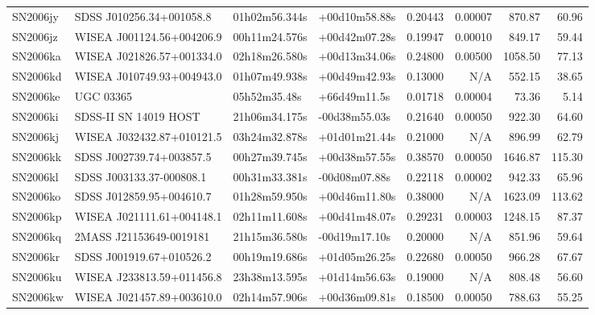 \begin{longtable}{llllrrrr}
SN2006jy         &        SDSS J010256.34+001058.8 &   01h02m56.344s &   +00d10m58.88s &  0.20443 &  0.00007 &   870.87 &       60.96 \\
SN2006jz         &       WISEA J001124.56+004206.9 &   00h11m24.576s &   +00d42m07.28s &  0.19947 &  0.00010 &   849.17 &       59.44 \\
SN2006ka         &       WISEA J021826.57+001334.0 &   02h18m26.580s &   +00d13m34.06s &  0.24800 &  0.00500 &  1058.50 &       77.13 \\
SN2006kd         &       WISEA J010749.93+004943.0 &   01h07m49.938s &   +00d49m42.93s &  0.13000 &      N/A &   552.15 &       38.65 \\
SN2006ke         &                       UGC 03365 &    05h52m35.48s &    +66d49m11.5s &  0.01718 &  0.00004 &    73.36 &        5.14 \\
SN2006ki         &           SDSS-II SN 14019 HOST &   21h06m34.175s &   -00d38m55.03s &  0.21640 &  0.00050 &   922.30 &       64.60 \\
SN2006kj         &       WISEA J032432.87+010121.5 &   03h24m32.878s &   +01d01m21.44s &  0.21000 &      N/A &   896.99 &       62.79 \\
SN2006kk         &        SDSS J002739.74+003857.5 &   00h27m39.745s &   +00d38m57.55s &  0.38570 &  0.00050 &  1646.87 &      115.30 \\
SN2006kl         &        SDSS J003133.37-000808.1 &   00h31m33.381s &   -00d08m07.88s &  0.22118 &  0.00002 &   942.33 &       65.96 \\
SN2006ko         &        SDSS J012859.95+004610.7 &   01h28m59.950s &   +00d46m11.80s &  0.38000 &      N/A &  1623.09 &      113.62 \\
SN2006kp         &       WISEA J021111.61+004148.1 &   02h11m11.608s &   +00d41m48.07s &  0.29231 &  0.00003 &  1248.15 &       87.37 \\
SN2006kq         &         2MASS J21153649-0019181 &   21h15m36.580s &   -00d19m17.10s &  0.20000 &      N/A &   851.96 &       59.64 \\
SN2006kr         &        SDSS J001919.67+010526.2 &   00h19m19.686s &   +01d05m26.25s &  0.22680 &  0.00050 &   966.28 &       67.67 \\
SN2006ku         &       WISEA J233813.59+011456.8 &   23h38m13.595s &   +01d14m56.63s &  0.19000 &      N/A &   808.48 &       56.60 \\
SN2006kw         &       WISEA J021457.89+003610.0 &   02h14m57.906s &   +00d36m09.81s &  0.18500 &  0.00050 &   788.63 &       55.25 \\

\end{longtable}
